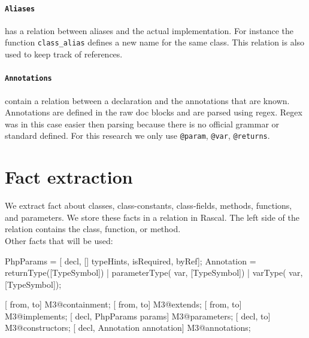 \documentclass[../main.tex]{subfiles}
\begin{document}
    \paragraph{\texttt{Aliases}} has a relation between aliases and the actual implementation.
    For instance the function \texttt{class\_alias} defines a new name for the same class.
    This relation is also used to keep track of references. 
    
    \paragraph{\texttt{Annotations}} contain a relation between a declaration and the annotations that are known.
    Annotations are defined in the raw doc blocks and are parsed using regex.
    Regex was in this case easier then parsing because there is no official grammar or standard defined.
    For this research we only use \texttt{@param}, \texttt{@var}, \texttt{@returns}.
    
    \section{Fact extraction}\label{sec:fact_extraction}
    We extract fact about classes, class-constants, class-fields, methods, functions, and parameters.
    We store these facts in a relation in Rascal.
    The left side of the relation contains the class, function, or method.
    \\
 
    Other facts that will be used:
    \begin{rascal} 
 PhpParams = [ decl, [] typeHints,  isRequired,  byRef];
 Annotation = returnType([TypeSymbol]) | parameterType( var, [TypeSymbol])
    | varType( var, [TypeSymbol]);

 [ from,  to] M3@containment;          
 [ from,  to] M3@extends;              
 [ from,  to] M3@implements;           
 [ decl, PhpParams params] M3@parameters; 
 [ decl,  to] M3@constructors;         
 [ decl, Annotation annotation] M3@annotations;  

    \end{rascal}
    
\end{document}
